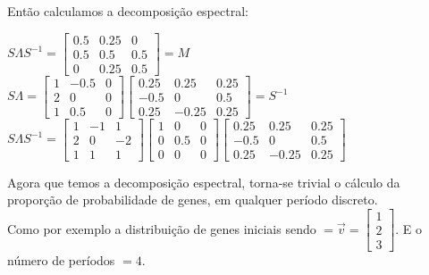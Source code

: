 \documentclass[14pt]{article}
\begin{document}
Então calculamos a decomposição espectral:

\begin{center}
    $S\Lambda S^{-1} = 
    \begin{bmatrix}
    0.5&0.25&0\\
    0.5&0.5&0.5\\
    0&0.25&0.5
    \end{bmatrix} = M $ \\
    $ $\\
    $ $\\
    
    $S \Lambda = \begin{bmatrix}
    1&-0.5&0\\
    2&0&0\\
    1&0.5&0
    \end{bmatrix} 
    \begin{bmatrix}
    0.25&0.25&0.25\\
    -0.5&0&0.5\\
    0.25&-0.25&0.25
    \end{bmatrix} = S^{-1}
    $\\
    $ $\\
    $ $\\
    $S\Lambda S^{-1} =
    \begin{bmatrix}
    1&-1&1\\
    2&0&-2\\
    1&1&1
    \end{bmatrix} 
    \begin{bmatrix}
    1&0&0\\
    0&0.5&0\\
    0&0&0
    \end{bmatrix}
    \begin{bmatrix}
    0.25&0.25&0.25\\
    -0.5&0&0.5\\
    0.25&-0.25&0.25
    \end{bmatrix}
    $
\end{center}

Agora que temos a decomposição espectral, torna-se trivial o cálculo da proporção de probabilidade de genes, em qualquer período discreto.
$ $\\

Como por exemplo a distribuição de genes iniciais sendo $= \vec{v} = \begin{bmatrix} 1\\ 2\\ 3 \end{bmatrix}$. E o número de períodos $= 4$. \\
\end{document}
